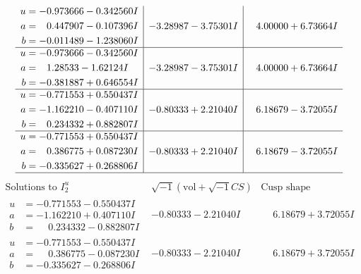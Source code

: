\documentclass[1p]{elsarticle_modified}
\theoremstyle{definition}
\newcommand{\I}{\sqrt{-1}}
\begin{document}
$$\begin{array}{c|c|c}
\begin{aligned}
u &= -0.973666 - 0.342560 I \\
a &= \phantom{-}0.447907 - 0.107396 I \\
b &= -0.011489 - 1.238060 I\end{aligned}
 & -3.28987 - 3.75301 I & \phantom{-}4.00000 + 6.73664 I \\ \hline\begin{aligned}
u &= -0.973666 - 0.342560 I \\
a &= \phantom{-}1.28533 - 1.62124 I \\
b &= -0.381887 + 0.646554 I\end{aligned}
 & -3.28987 - 3.75301 I & \phantom{-}4.00000 + 6.73664 I \\ \hline\begin{aligned}
u &= -0.771553 + 0.550437 I \\
a &= -1.162210 - 0.407110 I \\
b &= \phantom{-}0.234332 + 0.882807 I\end{aligned}
 & -0.80333 + 2.21040 I & \phantom{-}6.18679 - 3.72055 I \\ \hline\begin{aligned}
u &= -0.771553 + 0.550437 I \\
a &= \phantom{-}0.386775 + 0.087230 I \\
b &= -0.335627 + 0.268806 I\end{aligned}
 & -0.80333 + 2.21040 I & \phantom{-}6.18679 - 3.72055 I\\
 \hline 
 \end{array}$$\newpage$$\begin{array}{c|c|c}  
\text{Solutions to }I^u_{2}& \I (\text{vol} + \sqrt{-1}CS) & \text{Cusp shape}\\
 \hline 
\begin{aligned}
u &= -0.771553 - 0.550437 I \\
a &= -1.162210 + 0.407110 I \\
b &= \phantom{-}0.234332 - 0.882807 I\end{aligned}
 & -0.80333 - 2.21040 I & \phantom{-}6.18679 + 3.72055 I \\ \hline\begin{aligned}
u &= -0.771553 - 0.550437 I \\
a &= \phantom{-}0.386775 - 0.087230 I \\
b &= -0.335627 - 0.268806 I\end{aligned}
 & -0.80333 - 2.21040 I & \phantom{-}6.18679 + 3.72055 I \\ \hline\begin{aligned}

\end{aligned}
\end{array}$$
\end{document}
